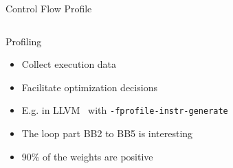 \documentclass[presentation]{beamer}
\begin{document}
\begin{frame}{Control Flow Profile}
    \begin{columns}[T]
        \begin{column}{0.47\textwidth}
            \begin{block}{Profiling}
                \begin{itemize}
                    \item Collect execution data
                    \item Facilitate optimization decisions
                    \item E.g. in LLVM~\cite{llvm_profdata} with \texttt{-fprofile-instr-generate}
                \end{itemize}
            \end{block}
            \begin{itemize}
                \item The loop part BB2 to BB5 is interesting
                \item 90\% of the weights are positive
            \end{itemize}
        \end{column}

        \begin{column}{0.53\textwidth}
            \centering
            
            \label{fig:controlflow_full}
        \end{column}
    \end{columns}
\end{frame}
\end{document}
